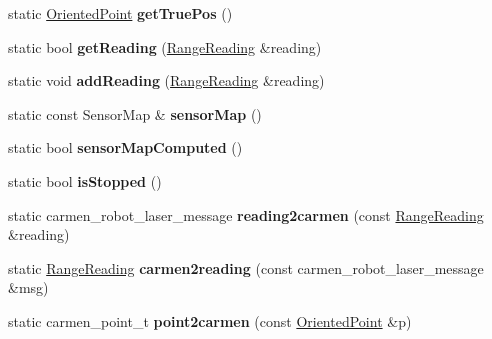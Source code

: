\begin{DoxyCompactItemize}
static \hyperlink{structGMapping_1_1orientedpoint}{Oriented\+Point} {\bfseries get\+True\+Pos} ()
\item 
\mbox{\label{classGMapping_1_1CarmenWrapper_a392dbec5a47fa9983e9360507539cce2}} 
static bool {\bfseries get\+Reading} (\hyperlink{classGMapping_1_1RangeReading}{Range\+Reading} \&reading)
\item 
\mbox{\label{classGMapping_1_1CarmenWrapper_a9fcaef9b837862625ed89ee7ed87c8fa}} 
static void {\bfseries add\+Reading} (\hyperlink{classGMapping_1_1RangeReading}{Range\+Reading} \&reading)
\item 
\mbox{\label{classGMapping_1_1CarmenWrapper_adc0c52ca35112e94a4725fd7063d76b7}} 
static const Sensor\+Map \& {\bfseries sensor\+Map} ()
\item 
\mbox{\label{classGMapping_1_1CarmenWrapper_a799d4c1b3beac71b0dad728cfd71d8d8}} 
static bool {\bfseries sensor\+Map\+Computed} ()
\item 
\mbox{\label{classGMapping_1_1CarmenWrapper_a91721c4c0a2c6a8457601be1213a984e}} 
static bool {\bfseries is\+Stopped} ()
\item 
\mbox{\label{classGMapping_1_1CarmenWrapper_aeb9718e12c6b32ae18abdef813289c97}} 
static carmen\+\_\+robot\+\_\+laser\+\_\+message {\bfseries reading2carmen} (const \hyperlink{classGMapping_1_1RangeReading}{Range\+Reading} \&reading)
\item 
\mbox{\label{classGMapping_1_1CarmenWrapper_ab0c60ce9bc9c7c7d26de194f049699ba}} 
static \hyperlink{classGMapping_1_1RangeReading}{Range\+Reading} {\bfseries carmen2reading} (const carmen\+\_\+robot\+\_\+laser\+\_\+message \&msg)
\item 
\mbox{\label{classGMapping_1_1CarmenWrapper_a12a53b4db961ba9616702e2ac6b9de59}} 
static carmen\+\_\+point\+\_\+t {\bfseries point2carmen} (const \hyperlink{structGMapping_1_1orientedpoint}{Oriented\+Point} \&p)
\item 
\mbox{\label{classGMapping_1_1CarmenWrapper_a13a86c06ccc18ca5a98dca103ce1d652}} 

\end{DoxyCompactItemize}
